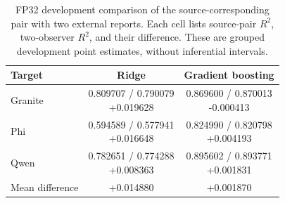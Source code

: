 \begin{table}[!htbp]
\centering\small\renewcommand{\arraystretch}{1.15}\setlength{\tabcolsep}{4pt}
\caption{FP32 development comparison of the source-corresponding pair with two external reports. Each cell lists source-pair \(R^2\), two-observer \(R^2\), and their difference. These are grouped development point estimates, without inferential intervals.}\label{tab:development_results}
\begin{tabularx}{\linewidth}{@{}>{\raggedright\arraybackslash}X c c@{}}
\toprule
Target & Ridge & Gradient boosting \\ \midrule
Granite & \shortstack{0.809707 / 0.790079\\+0.019628} & \shortstack{0.869600 / 0.870013\\-0.000413} \\
Phi & \shortstack{0.594589 / 0.577941\\+0.016648} & \shortstack{0.824990 / 0.820798\\+0.004193} \\
Qwen & \shortstack{0.782651 / 0.774288\\+0.008363} & \shortstack{0.895602 / 0.893771\\+0.001831} \\
Mean difference & +0.014880 & +0.001870 \\
\bottomrule\end{tabularx}
\end{table}
